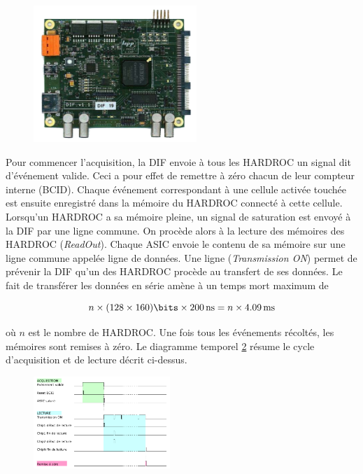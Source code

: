 \begin{figure}[ht!]
	\centering
	\includegraphics[width=0.55\textwidth]{GLA/DIF.png}
	\label{DIF}
\end{figure}

Pour commencer l'acquisition, la DIF envoie à tous les HARDROC un signal dit d'événement valide. Ceci a pour effet de remettre à zéro chacun de leur compteur interne (BCID). Chaque événement correspondant à une cellule activée touchée est ensuite enregistré dans la mémoire du HARDROC connecté à cette cellule. Lorsqu'un HARDROC a sa mémoire pleine, un signal de saturation est envoyé à la DIF par une ligne commune. On procède alors à la lecture des mémoires des HARDROC (\textit{ReadOut}). Chaque ASIC envoie le contenu de sa mémoire sur une ligne commune appelée ligne de données. Une ligne (\textit{Transmission ON}) permet de prévenir la DIF qu'un des HARDROC procède au transfert de ses données. Le fait de transférer les données en série amène à un temps mort maximum de

\begin{equation}
n\times(128 \times 160)\si{\bits}\times \SI{200}{\nano\second}= n\times\SI{4.09}{\milli\second}
\end{equation} 

où $n$ est le nombre de HARDROC. Une fois tous les événements récoltés, les mémoires sont remises à zéro. Le diagramme temporel \ref{temp} résume le cycle d'acquisition et de lecture décrit ci-dessus.

\begin{figure}[ht!]
	\centering
	\includegraphics[width=0.46\textwidth]{GLA/cycle.png}
	\label{temp}
\end{figure}

